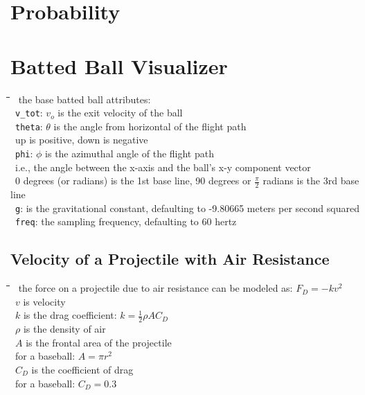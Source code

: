 \documentclass[10pt,letterpaper]{scrartcl}
\newcommand{\tbul}{\textbullet}
\newcommand{\tend}{\>\textendash}
\newcommand{\tasc}{\>\>\textasteriskcentered}
\newcommand{\tabDef}{\hspace{2em}\=\hspace{2em}\=\hspace{2em}\=\hspace{2em}\=\kill}
\begin{document}
\newpage\section{Probability}

\newpage\section{Batted Ball Visualizer}\begin{tabbing}\tabDef
\tbul\ the base batted ball attributes: \\
\tend\ \texttt{v\_tot}: $v_o$ is the exit velocity of the ball \\
\tend\ \texttt{theta}: $\theta$ is the angle from horizontal of the flight path \\
\tasc\ up is positive, down is negative \\
\tend\ \texttt{phi}: $\phi$ is the azimuthal angle of the flight path \\
\tasc\ i.e., the angle between the x-axis and the ball's x-y component vector \\
\tasc\ 0 degrees (or radians) is the 1st base line, 90 degrees or $\frac{\pi}{2}$ radians is the 3rd base line\\
\tend\ \texttt{g}: is the gravitational constant, defaulting to -9.80665 meters per second squared \\
\tend\ \texttt{freq}: the sampling frequency, defaulting to 60 hertz\end{tabbing}
\subsection{Velocity of a Projectile with Air Resistance}\begin{tabbing}\tabDef
\tbul\ the force on a projectile due to air resistance can be modeled as: $F_D = -kv^2$ \\
\tend\ $v$ is velocity \\
\tend\ $k$ is the drag coefficient: $k = \frac{1}{2}\rho A C_D$\\
\tend\ $\rho$ is the density of air \\
\tend\ $A$ is the frontal area of the projectile \\
\tasc\ for a baseball: $A = \pi r^2$ \\
\tend\ $C_D$ is the coefficient of drag \\
\tasc\ for a baseball: $C_D = 0.3$\end{tabbing}
\end{document}
